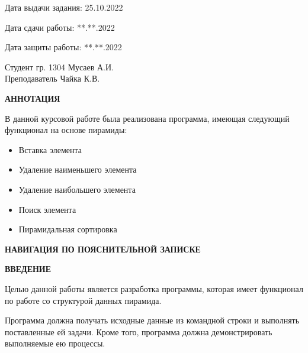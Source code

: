 \documentclass{article}
\begin{document}
\vspace{1cm}

Дата выдачи задания: 25.10.2022

Дата сдачи работы: **.**.2022

Дата защиты работы: **.**.2022\\

\vspace{3cm}

\Large{Студент гр. 1304 \qquad \qquad \quad \underline{\hspace{4cm}} \qquad \qquad Мусаев А.И.}\\[0.5cm]

\Large{Преподаватель \qquad \qquad \qquad \underline{\hspace{4cm}} \qquad \qquad Чайка К.В.}\\[1cm]

\newpage

\begin{center}
    \textbf{АННОТАЦИЯ}
\end{center}

В данной курсовой работе была реализована программа, имеющая следующий функционал на основе пирамиды:

\begin{itemize}
    \item Вставка элемента
    \item Удаление наименьшего элемента
    \item Удаление наибольшего элемента
    \item Поиск элемента
    \item Пирамидальная сортировка
\end{itemize}
\newpage

\begin{center}
    \textbf{НАВИГАЦИЯ ПО ПОЯСНИТЕЛЬНОЙ ЗАПИСКЕ}
\end{center}

\tableofcontents{}

\newpage

\begin{center}
    \textbf{ВВЕДЕНИЕ}
\end{center}

Целью данной работы является разработка программы, которая имеет функционал по работе со структурой данных пирамида.

Программа должна получать исходные данные из командной строки и выполнять поставленные ей задачи.
Кроме того, программа должна демонстрировать выполняемые ею процессы.
\end{document}
